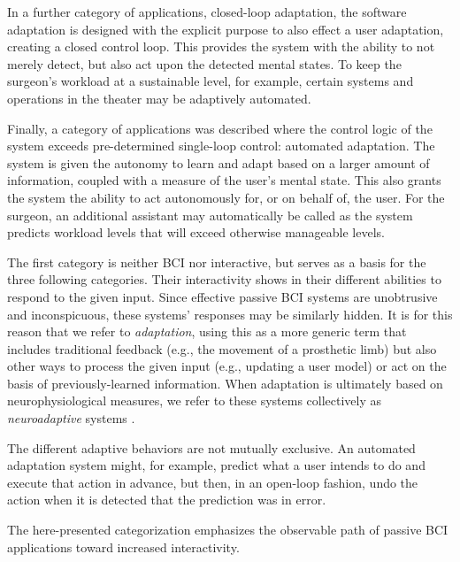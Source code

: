 In a further category of applications, closed-loop adaptation, the software adaptation is designed with the explicit purpose to also effect a user adaptation, creating a closed control loop. This provides the system with the ability to not merely detect, but also act upon the detected mental states. To keep the surgeon's workload at a sustainable level, for example, certain systems and operations in the theater may be adaptively automated.

Finally, a category of applications was described where the control logic of the system exceeds pre-determined single-loop control: automated adaptation. The system is given the autonomy to learn and adapt based on a larger amount of information, coupled with a measure of the user's mental state. This also grants the system the ability to act autonomously for, or on behalf of, the user. For the surgeon, an additional assistant may automatically be called as the system predicts workload levels that will exceed otherwise manageable levels.

The first category is neither BCI nor interactive, but serves as a basis for the three following categories. Their interactivity shows in their different abilities to respond to the given input. Since effective passive BCI systems are unobtrusive and inconspicuous, these systems' responses may be similarly hidden. It is for this reason that we refer to \emph{adaptation}, using this as a more generic term that includes traditional feedback (e.g., the movement of a prosthetic limb) but also other ways to process the given input (e.g., updating a user model) or act on the basis of previously-learned information. When adaptation is ultimately based on neurophysiological measures, we refer to these systems collectively as \emph{neuroadaptive} systems \cite{zander2016nat}.

The different adaptive behaviors are not mutually exclusive. An automated adaptation system might, for example, predict what a user intends to do and execute that action in advance, but then, in an open-loop fashion, undo the action when it is detected that the prediction was in error.

The here-presented categorization emphasizes the observable path of passive BCI applications toward increased interactivity.

